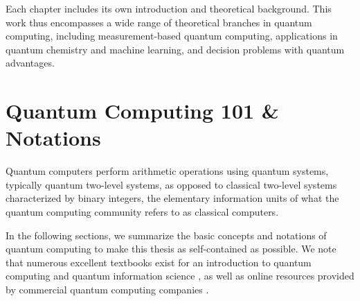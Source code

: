 \documentclass[../main.tex]{subfiles}
\begin{document}
Each chapter includes its own introduction and theoretical background. This work thus encompasses a wide range of theoretical branches in quantum computing, including measurement-based quantum computing, applications in quantum chemistry and machine learning, and decision problems with quantum advantages. 

\section{Quantum Computing 101 \& Notations}\label{sec:quantum101}

Quantum computers perform arithmetic operations using quantum systems, typically quantum two-level systems, as opposed to classical two-level systems characterized by binary integers, the elementary information units of what the quantum computing community refers to as classical computers.

In the following sections, we summarize the basic concepts and notations of quantum computing to make this thesis as self-contained as possible. We note that numerous excellent textbooks exist for an introduction to quantum computing and quantum information science \cite{nielsen2010quantum, wong2022introduction, watrous2018theory}, as well as online resources provided by commercial quantum computing companies \cite{2025learn, 2025quantum}.
\end{document}
